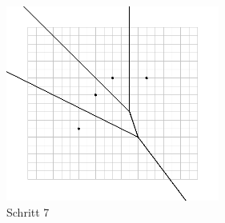 \begin{figure}[h]
\begin{center}
\includegraphics[width=7cm]{capture7}
\end{center}
\caption{Schritt 7}
\label{fig:c7}
\end{figure}